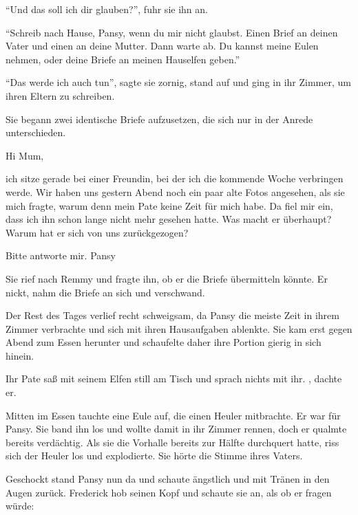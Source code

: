 \enquote{Und das soll ich dir glauben?}, fuhr sie ihn an.

\enquote{Schreib nach Hause, Pansy, wenn du mir nicht glaubst. Einen Brief an deinen Vater und einen an deine Mutter. Dann warte ab. Du kannst meine Eulen nehmen, oder deine Briefe an meinen Hauselfen geben.}

\enquote{Das werde ich auch tun}, sagte sie zornig, stand auf und ging in ihr Zimmer, um ihren Eltern zu schreiben.

Sie begann zwei identische Briefe aufzusetzen, die sich nur in der Anrede unterschieden.

\begin{brief}
Hi Mum,

ich sitze gerade bei einer Freundin, bei der ich die kommende Woche verbringen werde. Wir haben uns gestern Abend noch ein paar alte Fotos angesehen, als sie mich fragte, warum denn mein Pate keine Zeit für mich habe. Da fiel mir ein, dass ich ihn schon lange nicht mehr gesehen hatte. Was macht er überhaupt? Warum hat er sich von uns zurückgezogen?

Bitte antworte mir.
\signumspace
Pansy
\end{brief}

Sie rief nach Remmy und fragte ihn, ob er die Briefe übermitteln könnte. Er nickt, nahm die Briefe an sich und verschwand.

Der Rest des Tages verlief recht schweigsam, da Pansy die meiste Zeit in ihrem Zimmer verbrachte und sich mit ihren Hausaufgaben ablenkte. Sie kam erst gegen Abend zum Essen herunter und schaufelte daher ihre Portion gierig in sich hinein.

Ihr Pate saß mit seinem Elfen still am Tisch und sprach nichts mit ihr. , dachte er.

Mitten im Essen tauchte eine Eule auf, die einen Heuler mitbrachte. Er war für Pansy. Sie band ihn los und wollte damit in ihr Zimmer rennen, doch er qualmte bereits verdächtig. Als sie die Vorhalle bereits zur Hälfte durchquert hatte, riss sich der Heuler los und explodierte. Sie hörte die Stimme ihres Vaters.


Geschockt stand Pansy nun da und schaute ängstlich und mit Tränen in den Augen zurück. Frederick hob seinen Kopf und schaute sie an, als ob er fragen würde: 

